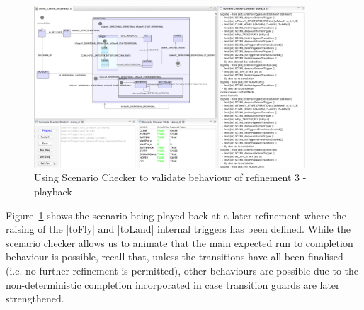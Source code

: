 \begin{figure}[!th]
\centering
\includegraphics[width=0.90\textwidth, trim=30 50 60 0]{figures/scenarioChecker_playback_drone3.png}
\caption{Using Scenario Checker to validate behaviour of refinement 3 - playback}
\label{fig:scenarioCheckerPlaybackDrone3}
\end{figure}

Figure~\ref{fig:scenarioCheckerPlaybackDrone3} shows the scenario being played back at a later refinement where the raising of the |toFly| and |toLand| internal triggers has been defined. 
While the scenario checker allows us to animate that the main expected run to completion behaviour is possible, recall that, unless the transitions have all been finalised (i.e. no further refinement is permitted),  other behaviours are possible due to the non-deterministic completion incorporated in case transition guards are later strengthened. 
 

